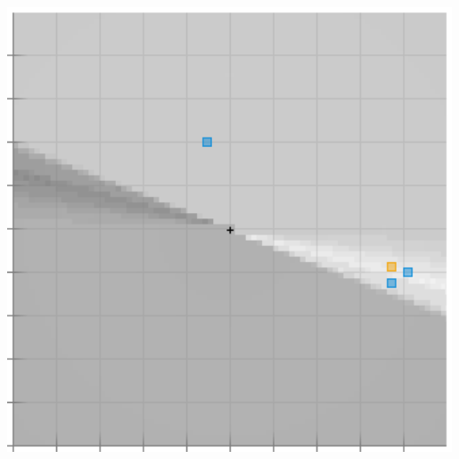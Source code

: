   \begin{marginfigure}[-2.2cm]
      \centering
      \includegraphics[width=0.99\textwidth]{example-mnist/train-weights.png}\\%
      \caption{%
        \textbf{Hypotheses differ in training accuracy: weight space.}
        We visualize $\hH$ as the $(a,b)$-plane (axes range
        $[-99,+99]$).  Each point determines a whole line in the
        brightness-width plane.  Shading shows training error: darker points
        misclassify more training examples.  The least shaded, most training-accurate
        hypothesis is $(-20, 83)$: the rightmost of the $3$
        {\blu blue squares}.
        The {\rng orange square} is the hypothesis that best fits our unseen
        testing data.
      }
      \label{fig:train-weights}
  \end{marginfigure}



